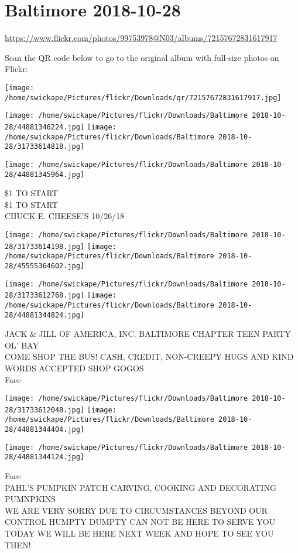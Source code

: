 \documentclass[10pt,letterpaper]{article}
\title{}
\author{}
\date{}
\begin{document}
\section*{Baltimore 2018-10-28}

\url{https://www.flickr.com/photos/99753978@N03/albums/72157672831617917}

Scan the QR code below to go to the original album with full-size photos on Flickr:

\texttt{[image: /home/swickape/Pictures/flickr/Downloads/qr/72157672831617917.jpg]}
\pagebreak

\texttt{[image: /home/swickape/Pictures/flickr/Downloads/Baltimore 2018-10-28/44881346224.jpg]}
\texttt{[image: /home/swickape/Pictures/flickr/Downloads/Baltimore 2018-10-28/31733614818.jpg]}

\vspace{0.25in}
\texttt{[image: /home/swickape/Pictures/flickr/Downloads/Baltimore 2018-10-28/44881345964.jpg]}

\$1 TO START\\
\$1 TO START\\
CHUCK E. CHEESE'S 10/26/18
\pagebreak

\texttt{[image: /home/swickape/Pictures/flickr/Downloads/Baltimore 2018-10-28/31733614198.jpg]}
\texttt{[image: /home/swickape/Pictures/flickr/Downloads/Baltimore 2018-10-28/45555364602.jpg]}

\texttt{[image: /home/swickape/Pictures/flickr/Downloads/Baltimore 2018-10-28/31733612768.jpg]}
\texttt{[image: /home/swickape/Pictures/flickr/Downloads/Baltimore 2018-10-28/44881344824.jpg]}

JACK \& JILL OF AMERICA, INC. BALTIMORE CHAPTER TEEN PARTY\\
OL' BAY\\
COME SHOP THE BUS!  CASH, CREDIT, NON{-}CREEPY HUGS AND KIND WORDS ACCEPTED SHOP GOGOS\\
Face
\pagebreak

\texttt{[image: /home/swickape/Pictures/flickr/Downloads/Baltimore 2018-10-28/31733612048.jpg]}
\texttt{[image: /home/swickape/Pictures/flickr/Downloads/Baltimore 2018-10-28/44881344404.jpg]}

\texttt{[image: /home/swickape/Pictures/flickr/Downloads/Baltimore 2018-10-28/44881344124.jpg]}

Face\\
PAHL'S PUMPKIN PATCH CARVING, COOKING AND DECORATING PUMNPKINS\\
WE ARE VERY SORRY DUE TO CIRCUMSTANCES BEYOND OUR CONTROL HUMPTY DUMPTY CAN NOT BE HERE TO SERVE YOU TODAY WE WILL BE HERE NEXT WEEK AND HOPE TO SEE YOU THEN!
\pagebreak
\end{document}
